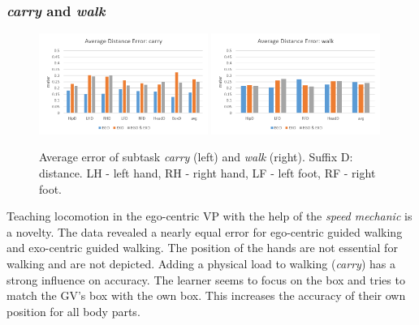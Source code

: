 \subsubsection{\textit{carry} and \textit{walk}}
\begin{figure}[htb]
	\centering
	\includegraphics[width=0.49\textwidth]{figures/distanceErrorCarry.png}
	\includegraphics[width=0.49\textwidth]{figures/distanceErrorWalk.png}
	\caption[Average error of subtasks \textit{carry} and \textit{walk}]{Average error of subtask \textit{carry} (left) and \textit{walk} (right). Suffix D: distance. LH - left hand, RH - right hand, LF - left foot, RF - right foot.}
	\label{fig:walkError}
\end{figure}
Teaching locomotion in the ego-centric VP with the help of the \textit{speed mechanic} is a novelty. The data revealed a nearly equal error for ego-centric guided walking and exo-centric guided walking. The position of the hands are not essential for walking and are not depicted. Adding a physical load to walking (\textit{carry}) has a strong influence on accuracy. The learner seems to focus on the box and tries to match the GV's box with the own box. This increases the accuracy of their own position for all body parts.

